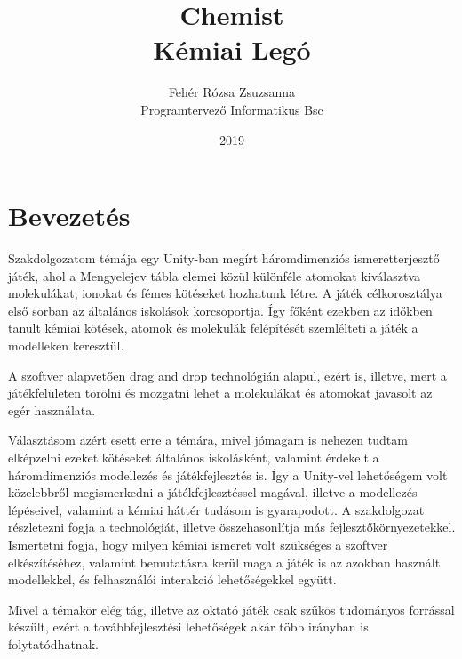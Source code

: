 \documentclass[colorlinks]{thesis-ekf}
\theoremstyle{definition}
\theoremstyle{remark}
\begin{document}
\title{Chemist \\ Kémiai Legó}
\author{Fehér Rózsa Zsuzsanna\\ Programtervező Informatikus Bsc}

\date{2019}
\maketitle
\tableofcontents

\chapter{Bevezetés}
Szakdolgozatom témája egy Unity-ban megírt háromdimenziós ismeretterjesztő játék, ahol a Mengyelejev tábla elemei közül különféle atomokat kiválasztva molekulákat, ionokat és fémes kötéseket hozhatunk létre.
A játék célkorosztálya első sorban az általános iskolások korcsoportja. Így főként ezekben az időkben tanult kémiai kötések, atomok és molekulák felépítését szemlélteti a játék a modelleken keresztül.

A szoftver alapvetően drag and drop technológián alapul, ezért is, illetve, mert a játékfelületen törölni és mozgatni lehet a molekulákat és atomokat javasolt az egér használata.

Választásom azért esett erre a témára, mivel jómagam is nehezen tudtam elképzelni ezeket kötéseket általános iskolásként, valamint érdekelt a háromdimenziós modellezés és játékfejlesztés is. Így a Unity-vel lehetőségem volt közelebbről megismerkedni a játékfejlesztéssel magával, illetve a modellezés lépéseivel, valamint a kémiai háttér tudásom is gyarapodott.
%
A szakdolgozat részletezni fogja a technológiát, illetve összehasonlítja más fejlesztőkörnyezetekkel. Ismertetni fogja, hogy milyen kémiai ismeret volt szükséges a szoftver elkészítéséhez, valamint bemutatásra kerül maga a játék is az azokban használt modellekkel, és felhasználói interakció lehetőségekkel együtt. 

Mivel a témakör elég tág, illetve az oktató játék csak szűkös tudományos forrással készült, ezért a továbbfejlesztési lehetőségek akár több irányban is folytatódhatnak.
\end{document}
